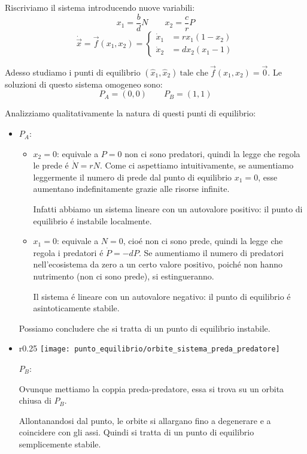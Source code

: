 \documentclass[../main.tex]{subfiles}
\begin{document}
		Riscriviamo il sistema introducendo nuove variabili:
		\[ 
			x_1 = \dfrac{b}{d} N \qquad x_2 = \dfrac{c}{r} P
		\]
		\[
			\dot{\vec x} = \vec f(x_1, x_2) = 
			\begin{cases}
				\dot x_1 &= r x_1 (1-x_2)\\
				\dot x_2 &= d x_2 (x_1 - 1)
			\end{cases}
		\]
		
		Adesso studiamo i punti di equilibrio $ (\hat x_1, \hat x_2)\ \text{tale che}\ \vec f(x_1, x_2) = \vec 0 $. Le soluzioni di questo sistema omogeneo sono:
		\[
			P_A = (0,0) \qquad P_B = (1,1)
		\]
		
		Analizziamo qualitativamente la natura di questi punti di equilibrio:
		\begin{itemize}
			\item
				$ P_A $:
				\begin{itemize}
					\item 
						$ x_2 = 0 $: equivale a $ P = 0 $ non ci sono predatori, quindi la legge che regola le prede \'e $ \dot N = rN $. Come ci aspettiamo intuitivamente, se aumentiamo leggermente il numero di prede dal punto di equilibrio $ x_1 = 0 $, esse aumentano indefinitamente grazie alle risorse infinite.
						
						Infatti abbiamo un sistema lineare con un autovalore positivo: il punto di equilibrio \'e instabile localmente.
					\item
						$ x_1 = 0 $: equivale a $ N = 0 $, cio\'e non ci sono prede, quindi la legge che regola i predatori \'e $ \dot P = -dP $. Se aumentiamo il numero di predatori nell'ecosistema da zero a un certo valore positivo, poich\'e non hanno nutrimento (non ci sono prede), si estingueranno.
						
						Il sistema \'e lineare con un autovalore negativo: il punto di equilibrio \'e asintoticamente stabile.
				\end{itemize}
				Possiamo concludere che si tratta di un punto di equilibrio instabile.
			\item
				\parbox[t]{\dimexpr\textwidth-\leftmargin}{
					\vspace{-2.5mm}
					\begin{wrapfigure}[10]{r}{0.25\textwidth}
						\centering
						\vspace{-\baselineskip}
						\texttt{[image: punto\_equilibrio/orbite\_sistema\_preda\_predatore]}
					\end{wrapfigure}
					$ P_B $:
					
					Ovunque mettiamo la coppia preda-predatore, essa si trova su un orbita chiusa di $ P_B $.
					
					Allontanandosi dal punto, le orbite si allargano fino a degenerare e a coincidere con gli assi. Quindi si tratta di un punto di equilibrio semplicemente stabile.
				}
		\end{itemize}
	
\end{document}

